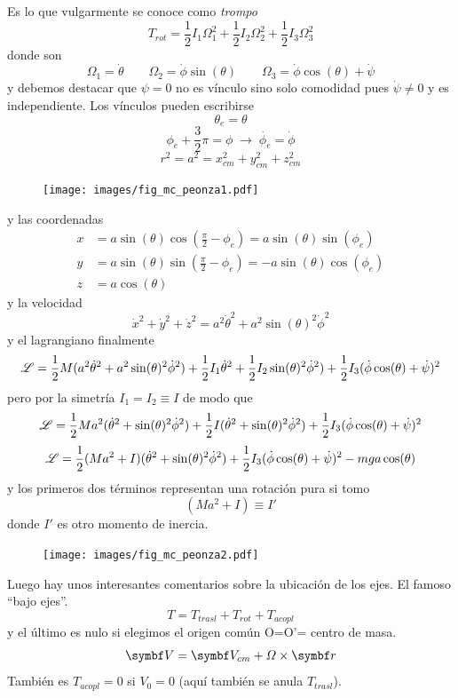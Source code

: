\documentclass[10pt,oneside]{CBFT_book}
\begin{document}
Es lo que vulgarmente se conoce como {\it trompo}
\[
	T_{rot} = \frac{1}{2} I_1 \Omega^2_ 1 + \frac{1}{2} I_2 \Omega^2_2 + \frac{1}{2} I_3 \Omega^2_3 
\]
donde son 
\[
	\Omega_1 = \dot{\theta} \qquad \Omega_2 = \dot{\phi} \sin(\theta) \qquad \Omega_3 = \dot{\phi} \cos(\theta) + \dot{\psi}
\]
y debemos destacar que $\psi=0$ no es vínculo sino solo comodidad pues $\dot{\psi} \neq 0$ y es independiente.
Los vínculos pueden escribirse
\[
	\theta_e = \theta
\]
\[
	\phi_e + \frac{3}{2}\pi = \phi \; \longrightarrow \; \dot{\phi_e} = \dot{\phi}
\]
\[
	r^2 = a^2 = x_{cm}^2 + y_{cm}^2 + z_{cm}^2
\]
\begin{figure}[htb]
	\begin{center}
	\texttt{[image: images/fig\_mc\_peonza1.pdf]}	 
	\end{center}
	\caption{}
\end{figure} 
y las coordenadas
\begin{align*}
	x &= a \sin(\theta) \cos\left( \frac{\pi}{2}-\phi_e \right) = a \sin(\theta) \sin( \phi_e ) \\
	y &= a \sin(\theta) \sin\left( \frac{\pi}{2}-\phi_e \right) = -a \sin(\theta) \cos( \phi_e ) \\
	z &= a \cos(\theta)
\end{align*}
y la velocidad
\[
	\dot{x}^2 + \dot{y}^2 + \dot{z}^2 = a^2 \dot{\theta}^2 + a^2 \sin(\theta)^2 \dot{\phi}^2
\]
y el lagrangiano finalmente
\[
	\mathscr{L} = \frac{1}{2} M (a^2 \dot{\theta}^2 + a^2 \sin(\theta)^2 \dot{\phi}^2) + \frac{1}{2} I_1 \dot{\theta}^2
	+ \frac{1}{2} I_2 \sin(\theta)^2 \dot{\phi}^2) + \frac{1}{2} I_3 (\dot{\phi} \cos(\theta) + \dot{\psi})^2 
\]
pero por la simetría $I_1=I_2\equiv I$ de modo que 
\[
	\mathscr{L} = \frac{1}{2} M a^2 (\dot{\theta}^2 + \sin(\theta)^2 \dot{\phi}^2) + \frac{1}{2} I ( \dot{\theta}^2 +
	\sin(\theta)^2 \dot{\phi}^2 ) + \frac{1}{2} I_3 (\dot{\phi} \cos(\theta) + \dot{\psi})^2 
\]
\[
	\mathscr{L} = \frac{1}{2} ( M a^2 + I ) (\dot{\theta}^2 + \sin(\theta)^2 \dot{\phi}^2) +  
		\frac{1}{2} I_3 (\dot{\phi} \cos(\theta) + \dot{\psi})^2  - m g a \cos(\theta)
\]
y los primeros dos términos representan una rotación pura si tomo 
\[
	( M a^2 + I ) \equiv I' 
\]
donde $I'$ es otro momento de inercia.
\begin{figure}[htb]
	\begin{center}
	\texttt{[image: images/fig\_mc\_peonza2.pdf]}	 
	\end{center}
	\caption{}
\end{figure} 

Luego hay unos interesantes comentarios sobre la ubicación de los ejes. El famoso ``bajo ejes''.
\[
	T = T_{trasl} + T_{rot} + T_{acopl}
\]
y el último es nulo si elegimos el origen común O=O'= centro de masa.
\[
	\vb{V} = \vb{V}_{cm} + \Omega \times \vb{r}
\]
También es $T_{acopl}=0$ si $V_0=0$ (aquí también se anula $T_{trasl}$).
\end{document}
